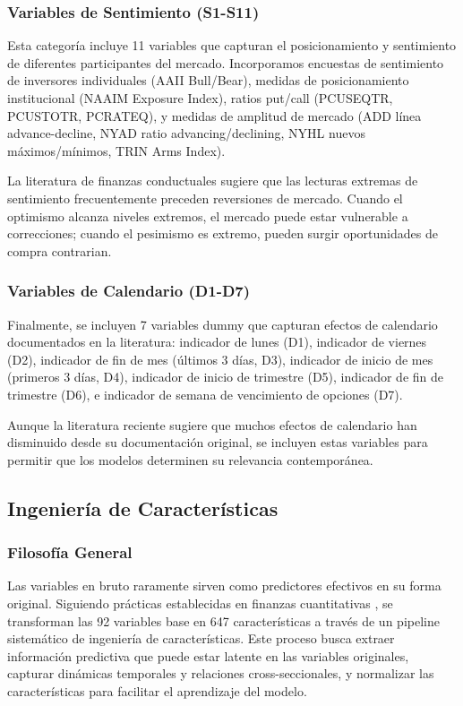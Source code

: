 \documentclass[11pt,a4paper]{article}
\begin{document}
\subsubsection{Variables de Sentimiento (S1-S11)}

Esta categoría incluye 11 variables que capturan el posicionamiento y sentimiento de diferentes participantes del mercado. Incorporamos encuestas de sentimiento de inversores individuales (AAII Bull/Bear), medidas de posicionamiento institucional (NAAIM Exposure Index), ratios put/call (PCUSEQTR, PCUSTOTR, PCRATEQ), y medidas de amplitud de mercado (ADD línea advance-decline, NYAD ratio advancing/declining, NYHL nuevos máximos/mínimos, TRIN Arms Index).

La literatura de finanzas conductuales sugiere que las lecturas extremas de sentimiento frecuentemente preceden reversiones de mercado. Cuando el optimismo alcanza niveles extremos, el mercado puede estar vulnerable a correcciones; cuando el pesimismo es extremo, pueden surgir oportunidades de compra contrarian.

\subsubsection{Variables de Calendario (D1-D7)}

Finalmente, se incluyen 7 variables dummy que capturan efectos de calendario documentados en la literatura: indicador de lunes (D1), indicador de viernes (D2), indicador de fin de mes (últimos 3 días, D3), indicador de inicio de mes (primeros 3 días, D4), indicador de inicio de trimestre (D5), indicador de fin de trimestre (D6), e indicador de semana de vencimiento de opciones (D7).

Aunque la literatura reciente sugiere que muchos efectos de calendario han disminuido desde su documentación original, se incluyen estas variables para permitir que los modelos determinen su relevancia contemporánea.

\subsection{Ingeniería de Características}

\subsubsection{Filosofía General}

Las variables en bruto raramente sirven como predictores efectivos en su forma original. Siguiendo prácticas establecidas en finanzas cuantitativas \citep{gu2020}, se transforman las 92 variables base en 647 características a través de un pipeline sistemático de ingeniería de características. Este proceso busca extraer información predictiva que puede estar latente en las variables originales, capturar dinámicas temporales y relaciones cross-seccionales, y normalizar las características para facilitar el aprendizaje del modelo.
\end{document}
